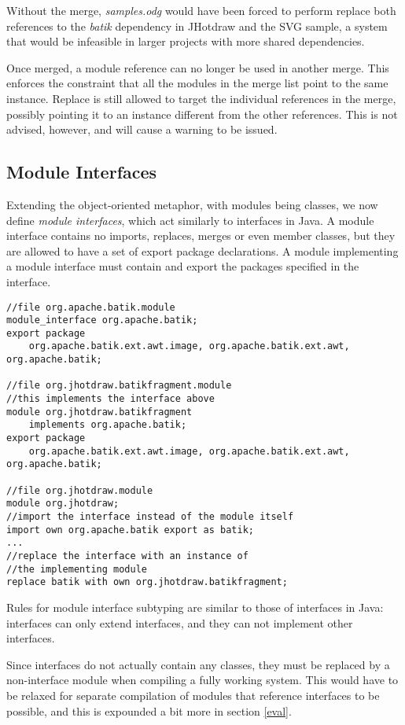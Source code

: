 Without the merge, \textit{samples.odg} would have been forced to perform 
replace both references to the \textit{batik} dependency
in JHotdraw and the SVG sample, a system that would be infeasible in larger projects
with more shared dependencies.

Once merged, a module reference can no longer be used in another merge. This
enforces the constraint that all the modules in the merge list point to the
same instance. Replace is still allowed to target the individual 
references in the merge, possibly pointing it to an instance different from
the other references. This is not advised, however, and will cause a warning to be
issued.

\subsection{Module Interfaces}

Extending the object-oriented metaphor, with modules being classes, we 
now define \textit{module interfaces}, which act similarly to interfaces in Java. A module
interface contains no imports, replaces, merges or even member classes, but they
are allowed to have a set of export package declarations. A module implementing
a module interface must contain and export the packages specified in the interface.

\begin{lstlisting}[caption=Module Interfaces]
//file org.apache.batik.module
module_interface org.apache.batik;
export package 
	org.apache.batik.ext.awt.image,	org.apache.batik.ext.awt,	org.apache.batik;

//file org.jhotdraw.batikfragment.module
//this implements the interface above
module org.jhotdraw.batikfragment 
	implements org.apache.batik;
export package 
	org.apache.batik.ext.awt.image,	org.apache.batik.ext.awt,	org.apache.batik;

//file org.jhotdraw.module
module org.jhotdraw;
//import the interface instead of the module itself
import own org.apache.batik export as batik;
...
//replace the interface with an instance of
//the implementing module
replace batik with own org.jhotdraw.batikfragment; 
\end{lstlisting}

Rules for module interface subtyping are similar to those of interfaces in Java:
interfaces can only extend interfaces, and they can not implement other
interfaces. 

Since interfaces do not actually contain any classes, they must be replaced
by a non-interface module when compiling a fully working system. This would
have to be relaxed for separate compilation of modules that reference interfaces
to be possible, and this is expounded a bit more in section \ref{eval}.

